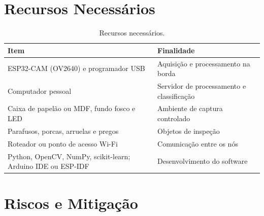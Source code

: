 \documentclass[12pt]{article}
\begin{document}
\section{Recursos Necessários}
\label{sec:recursos}

\begin{table}[H]
  \centering
  \caption{Recursos necessários.}
  \label{tab:recursos}
  \begin{tabularx}{\textwidth}{>{\raggedright\arraybackslash}X >{\raggedright\arraybackslash}X}
    \toprule
    \textbf{Item} & \textbf{Finalidade} \\
    \midrule
    ESP32-CAM (OV2640) e programador USB & Aquisição e processamento na borda \\
    Computador pessoal & Servidor de processamento e classificação \\
    Caixa de papelão ou MDF, fundo fosco e LED & Ambiente de captura controlado \\
    Parafusos, porcas, arruelas e pregos & Objetos de inspeção \\
    Roteador ou ponto de acesso Wi-Fi & Comunicação entre os nós \\
    Python, OpenCV, NumPy, scikit-learn; Arduino IDE ou ESP-IDF & Desenvolvimento do software \\
    \bottomrule
  \end{tabularx}
\end{table}

\section{Riscos e Mitigação}
\label{sec:riscos}
\end{document}
